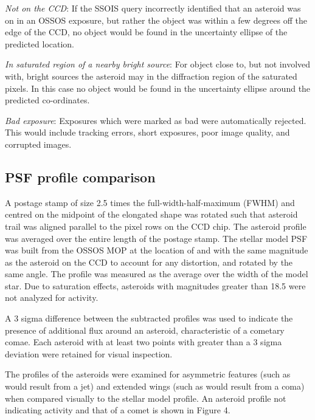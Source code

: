 \documentclass[iop,apj]{emulateapj}
\begin{document}
\textit{Not on the CCD}:
If the SSOIS query incorrectly identified that an asteroid was on in an OSSOS exposure, but rather the object was within a few degrees off the edge of the CCD, no object would be found in the uncertainty ellipse of the predicted location.

\textit{In saturated region of a nearby bright source}:
For object close to, but not involved with, bright sources the asteroid may in the diffraction region of the saturated pixels. In this case no object would be found in the uncertainty ellipse around the predicted co-ordinates.

\textit{Bad exposure}:
Exposures which were marked as bad were automatically rejected. This would include tracking errors, short exposures, poor image quality, and corrupted images. 

\subsection{PSF profile comparison}

A postage stamp of size 2.5 times the full-width-half-maximum (FWHM) and centred on the midpoint of the elongated shape was rotated such that asteroid trail was aligned parallel to the pixel rows on the CCD chip. The asteroid profile was averaged over the entire length of the postage stamp. The stellar model PSF was built from the OSSOS MOP at the location of and with the same magnitude as the asteroid on the CCD to account for any distortion, and rotated by the same angle.  The profile was measured as the average over the width of the model star. Due to saturation effects, asteroids with magnitudes greater than 18.5 were not analyzed for activity.

A 3 sigma difference between the subtracted profiles was used to indicate the presence of additional flux around an asteroid, characteristic of a cometary comae. Each asteroid with at least two points with greater than a 3 sigma deviation were retained for visual inspection.

The profiles of the asteroids were examined for asymmetric features (such as would result from a jet) and extended wings (such as would result from a coma) when compared visually to the stellar model profile. An asteroid profile not indicating activity and that of a comet is shown in Figure 4. 
\end{document}

